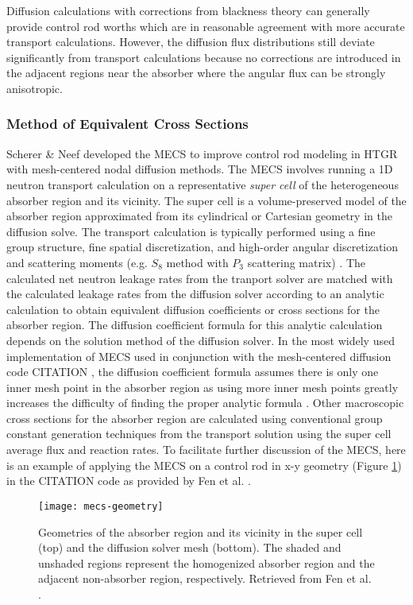 Diffusion calculations with corrections from blackness theory can generally provide control rod
worths which are in reasonable agreement with more accurate transport calculations. However, the
diffusion flux distributions still deviate significantly from transport calculations because no
corrections are introduced in the adjacent regions near the absorber where the angular flux can be
strongly anisotropic.

\subsubsection{Method of Equivalent Cross Sections}

Scherer \& Neef developed the \gls{MECS} \cite{scherer_determination_1976} to improve control rod
modeling in \gls{HTGR} with mesh-centered nodal diffusion methods. The \gls{MECS} involves running
a 1D neutron transport calculation on a representative \textit{super cell} of the heterogeneous
absorber region and its vicinity. The super cell is a volume-preserved model of the absorber region
approximated from its cylindrical or Cartesian geometry in the diffusion solve. The transport
calculation is typically performed using a fine group structure, fine spatial discretization, and
high-order angular discretization and scattering moments (e.g. $S_8$ method with $P_3$ scattering
matrix) \cite{fen_modelling_1992}. The calculated net neutron leakage rates from the tranport
solver are matched with the calculated leakage rates from the diffusion solver according to an
analytic calculation to obtain equivalent diffusion coefficients or cross sections for the absorber
region. The diffusion coefficient formula for this analytic calculation depends on the solution
method of the diffusion solver. In the most widely used implementation of \gls{MECS} used in
conjunction with the mesh-centered diffusion code CITATION \cite{teuchert_vsop94_1994}, the
diffusion coefficient formula assumes there is only one inner mesh point in the absorber region as
using more inner mesh points greatly increases the difficulty of finding the proper analytic
formula \cite{fen_modelling_1992}. Other macroscopic cross sections for the absorber region are
calculated using conventional group constant generation techniques from the transport solution
using the super cell average flux and reaction rates. To facilitate further discussion of the
\gls{MECS}, here is an example of applying the \gls{MECS} on a control rod in x-y geometry (Figure
\ref{fig:mecs-geometry}) in the CITATION code as provided by Fen et al. \cite{fen_modelling_1992}.
%
\begin{figure}[htb!]
    \centering
    \texttt{[image: mecs-geometry]}
    \caption{Geometries of the absorber region and its vicinity in the super
        cell (top) and the diffusion solver mesh (bottom).
        The shaded and unshaded regions represent the homogenized absorber
        region and the adjacent non-absorber region, respectively.
        Retrieved from Fen et al. \cite{fen_modelling_1992}.}
    \label{fig:mecs-geometry}
\end{figure}

